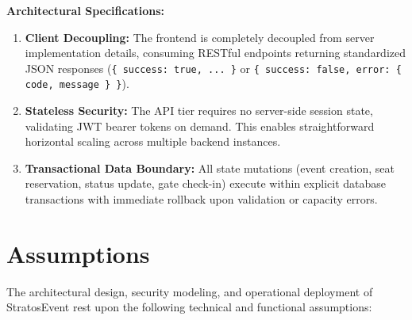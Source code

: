 \documentclass[11pt,a4paper]{article}
\begin{document}
\vspace{0.20in}
\noindent
\textbf{Architectural Specifications:}
\begin{enumerate}[leftmargin=*]
    \item \textbf{Client Decoupling:} The frontend is completely decoupled from server implementation details, consuming RESTful endpoints returning standardized JSON responses (\texttt{\{ success: true, ... \}} or \texttt{\{ success: false, error: \{ code, message \} \}}).
    \item \textbf{Stateless Security:} The API tier requires no server-side session state, validating JWT bearer tokens on demand. This enables straightforward horizontal scaling across multiple backend instances.
    \item \textbf{Transactional Data Boundary:} All state mutations (event creation, seat reservation, status update, gate check-in) execute within explicit database transactions with immediate rollback upon validation or capacity errors.
\end{enumerate}

\newpage
\section*{{\color{TitleBlue}\bfseries
\fontsize{18}{22}\selectfont Assumptions}}

\vspace{0.10in}

The architectural design, security modeling, and operational deployment of StratosEvent rest upon the following technical and functional assumptions:
\end{document}
